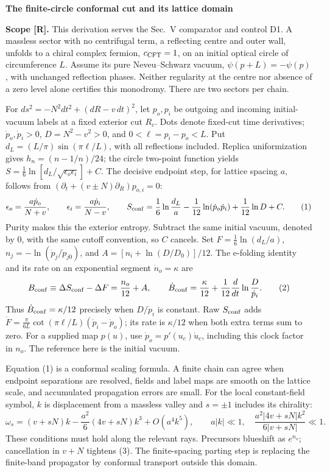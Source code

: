 \documentclass[10pt]{article}
\begin{document}
\small
\begin{center}
\textbf{The finite-circle conformal cut and its lattice domain}
\end{center}
\vspace{-5pt}
\textbf{Scope [R].}
This derivation serves the Sec.~V comparator and control D1.  A massless
sector with no centrifugal term, a reflecting centre and outer wall,
unfolds to a chiral complex fermion, \(c_{\rm CFT}=1\), on an initial
optical circle of circumference \(L\).  Assume its pure Neveu--Schwarz
vacuum, \(\psi(p+L)=-\psi(p)\), with unchanged reflection phases.
Neither regularity at the centre nor absence of a zero level alone
certifies this monodromy.  There are two sectors per chain.

For \(ds^2=-N^2dt^2+(dR-v\,dt)^2\), let \(p_o,p_i\) be outgoing
and incoming initial-vacuum labels at a fixed exterior cut \(R_c\).
Dots denote fixed-cut time derivatives;
\(\dot p_o,\dot p_i>0\), \(D=N^2-v^2>0\),
and \(0<\ell=p_i-p_o<L\).  Put
\(d_L=(L/\pi)\sin(\pi\ell/L)\), with all reflections included.
Replica uniformization gives \(h_n=(n-1/n)/24\); the circle
two-point function yields
\(S=\frac16\ln[d_L/\sqrt{\epsilon_o\epsilon_i}]+C\).
The decisive endpoint step, for lattice spacing \(a\), follows from
\((\partial_t+(v\pm N)\partial_R)p_{o,i}=0\):
\[
 \epsilon_o=\frac{a\dot p_o}{N+v},\qquad
 \epsilon_i=\frac{a\dot p_i}{N-v},\qquad
 S_{\rm conf}=\frac16\ln\frac{d_L}a
       -\frac1{12}\ln(\dot p_o\dot p_i)+\frac1{12}\ln D+C .
 \tag{1}
\]
Purity makes this the exterior entropy.  Subtract the same initial
vacuum, denoted by \(0\), with the same cutoff convention, so \(C\)
cancels.  Set \(F=\frac16\ln(d_L/a)\),
\(n_j=-\ln(\dot p_j/\dot p_{j0})\), and
\(A=[n_i+\ln(D/D_0)]/12\).  The e-folding identity and its rate
on an exponential segment \(\dot n_o=\kappa\) are
\[
 B_{\rm conf}\equiv\Delta S_{\rm conf}-\Delta F=\frac{n_o}{12}+A,
 \qquad
 \dot B_{\rm conf}=\frac{\kappa}{12}
       +\frac1{12}\frac{d}{dt}\ln\frac{D}{\dot p_i}.
 \tag{2}
\]
Thus \(\dot B_{\rm conf}=\kappa/12\) precisely when \(D/\dot p_i\)
is constant.  Raw \(S_{\rm conf}\) adds
\(\dot F=\frac{\pi}{6L}\cot(\pi\ell/L)(\dot p_i-\dot p_o)\);
its rate is \(\kappa/12\) when both extra terms sum to zero.
For a supplied map \(p(u)\), use
\(\dot p_o=p'(u_c)\dot u_c\), including this clock factor in \(n_o\).
The reference here is the initial vacuum.

Equation (1) is a conformal scaling formula.  A finite chain can agree
when endpoint separations are resolved, fields and label maps are smooth
on the lattice scale, and accumulated propagation errors are small.
For the local constant-field symbol, \(k\) is displacement from a massless
valley and \(s=\pm1\) includes its chirality:
\[
 \omega_s=(v+sN)k-\frac{a^2}{6}(4v+sN)k^3+O(a^4k^5),\qquad
 a|k|\ll1,\quad
 \frac{a^2|4v+sN|k^2}{6|v+sN|}\ll1 .
 \tag{3}
\]
These conditions must hold along the relevant rays.  Precursors
blueshift as \(e^{n_o}\); cancellation in \(v+N\) tightens (3).
The finite-spacing parting step is replacing the finite-band propagator
by conformal transport outside this domain.
\end{document}
